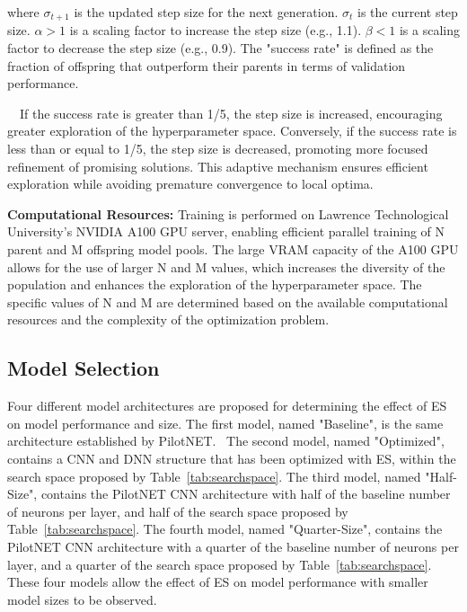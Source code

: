 \documentclass[conference]{IEEEtran}
\begin{document}
\begin{enumerate}
          where \(\sigma_{t+1}\) is the updated step size for the next generation. \(\sigma_t\) is the current step size. \(\alpha > 1\) is a scaling factor to increase the step size (e.g., 1.1). \(\beta < 1\) is a scaling factor to decrease the step size (e.g., 0.9). The "success rate" is defined as the fraction of offspring that outperform their parents in terms of validation performance.

          ~~If the success rate is greater than 1/5, the step size is increased, encouraging greater exploration of the hyperparameter space. Conversely, if the success rate is less than or equal to 1/5, the step size is decreased, promoting more focused refinement of promising solutions. This adaptive mechanism ensures efficient exploration while avoiding premature convergence to local optima.

\end{enumerate}

\textbf{Computational Resources: } Training is performed on Lawrence Technological University's NVIDIA A100 GPU server, enabling efficient parallel training of N parent and M offspring model pools. The large VRAM capacity of the A100 GPU allows for the use of larger N and M values, which increases the diversity of the population and enhances the exploration of the hyperparameter space. The specific values of N and M are determined based on the available computational resources and the complexity of the optimization problem.

\subsection{Model Selection}

Four different model architectures are proposed for determining the effect of ES on model performance and size. The first model, named "Baseline", is the same architecture established by PilotNET.~\cite{PilotNET} The second model, named "Optimized", contains a CNN and DNN structure that has been optimized with ES, within the search space proposed by Table~\ref{tab:searchspace}. The third model, named "Half-Size", contains the PilotNET CNN architecture with half of the baseline number of neurons per layer, and half of the search space proposed by Table~\ref{tab:searchspace}. The fourth model, named "Quarter-Size", contains the PilotNET CNN architecture with a quarter of the baseline number of neurons per layer, and a quarter of the search space proposed by Table~\ref{tab:searchspace}. These four models allow the effect of ES on model performance with smaller model sizes to be observed.
\end{document}
